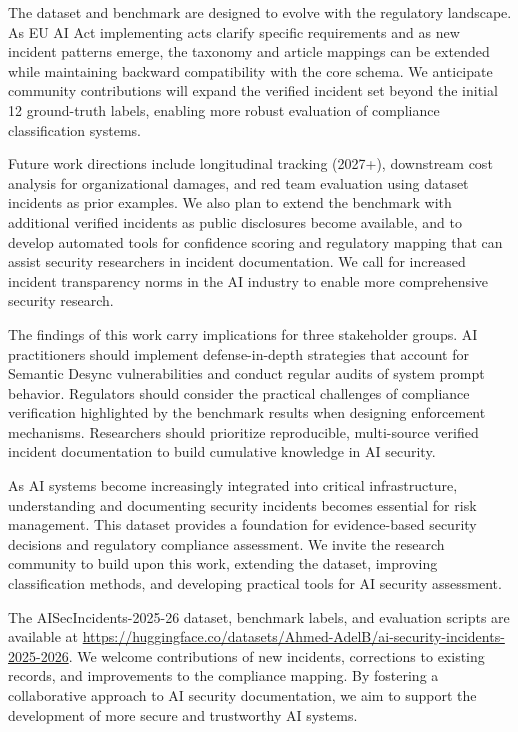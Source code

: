 \documentclass[10pt,conference]{IEEEtran}
\begin{document}
The dataset and benchmark are designed to evolve with the regulatory landscape. As EU AI Act implementing acts clarify specific requirements and as new incident patterns emerge, the taxonomy and article mappings can be extended while maintaining backward compatibility with the core schema. We anticipate community contributions will expand the verified incident set beyond the initial 12 ground-truth labels, enabling more robust evaluation of compliance classification systems.

Future work directions include longitudinal tracking (2027+), downstream cost analysis for organizational damages, and red team evaluation using dataset incidents as prior examples. We also plan to extend the benchmark with additional verified incidents as public disclosures become available, and to develop automated tools for confidence scoring and regulatory mapping that can assist security researchers in incident documentation. We call for increased incident transparency norms in the AI industry to enable more comprehensive security research.

The findings of this work carry implications for three stakeholder groups. AI practitioners should implement defense-in-depth strategies that account for Semantic Desync vulnerabilities and conduct regular audits of system prompt behavior. Regulators should consider the practical challenges of compliance verification highlighted by the benchmark results when designing enforcement mechanisms. Researchers should prioritize reproducible, multi-source verified incident documentation to build cumulative knowledge in AI security.

As AI systems become increasingly integrated into critical infrastructure, understanding and documenting security incidents becomes essential for risk management. This dataset provides a foundation for evidence-based security decisions and regulatory compliance assessment. We invite the research community to build upon this work, extending the dataset, improving classification methods, and developing practical tools for AI security assessment.

The AISecIncidents-2025-26 dataset, benchmark labels, and evaluation scripts are available at \url{https://huggingface.co/datasets/Ahmed-AdelB/ai-security-incidents-2025-2026}. We welcome contributions of new incidents, corrections to existing records, and improvements to the compliance mapping. By fostering a collaborative approach to AI security documentation, we aim to support the development of more secure and trustworthy AI systems.
\end{document}
